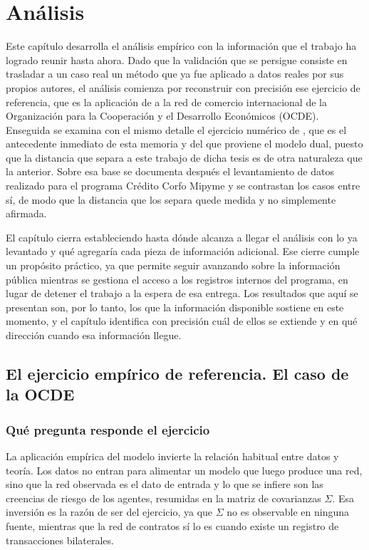 
\chapter{Análisis}
\label{c4}

Este capítulo desarrolla el análisis empírico con la información que el trabajo ha logrado reunir hasta ahora. Dado que la validación que se persigue consiste en trasladar a un caso real un método que ya fue aplicado a datos reales por sus propios autores, el análisis comienza por reconstruir con precisión ese ejercicio de referencia, que es la aplicación de  a la red de comercio internacional de la Organización para la Cooperación y el Desarrollo Económicos (OCDE). Enseguida se examina con el mismo detalle el ejercicio numérico de , que es el antecedente inmediato de esta memoria y del que proviene el modelo dual, puesto que la distancia que separa a este trabajo de dicha tesis es de otra naturaleza que la anterior. Sobre esa base se documenta después el levantamiento de datos realizado para el programa Crédito Corfo Mipyme y se contrastan los casos entre sí, de modo que la distancia que los separa quede medida y no simplemente afirmada.

El capítulo cierra estableciendo hasta dónde alcanza a llegar el análisis con lo ya levantado y qué agregaría cada pieza de información adicional. Ese cierre cumple un propósito práctico, ya que permite seguir avanzando sobre la información pública mientras se gestiona el acceso a los registros internos del programa, en lugar de detener el trabajo a la espera de esa entrega. Los resultados que aquí se presentan son, por lo tanto, los que la información disponible sostiene en este momento, y el capítulo identifica con precisión cuál de ellos se extiende y en qué dirección cuando esa información llegue.

\section{El ejercicio empírico de referencia. El caso de la OCDE}
\label{c4:ocde}

\subsection{Qué pregunta responde el ejercicio}
\label{c4:ocde-pregunta}

La aplicación empírica del modelo invierte la relación habitual entre datos y teoría. Los datos no entran para alimentar un modelo que luego produce una red, sino que la red observada es el dato de entrada y lo que se infiere son las creencias de riesgo de los agentes, resumidas en la matriz de covarianzas $\Sigma$. Esa inversión es la razón de ser del ejercicio, ya que $\Sigma$ no es observable en ninguna fuente, mientras que la red de contratos sí lo es cuando existe un registro de transacciones bilaterales.

